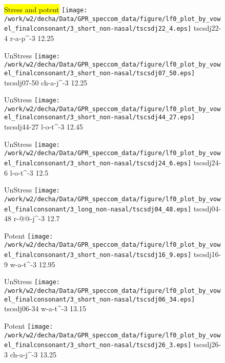 \documentclass{article}
\begin{document}
\begin{figure}[t]
\begin{minipage}[b]{.24\textwidth}
\colorbox{yellow}{Stress and potent}
\centering
\texttt{[image: /work/w2/decha/Data/GPR\_speccom\_data/figure/lf0\_plot\_by\_vowel\_finalconsonant/3\_short\_non-nasal/tscsdj22\_4.eps]}
tscsdj22-4 r-a-p\textasciicircum-3 12.25
\end{minipage}
\begin{minipage}[b]{.24\textwidth}
UnStress
\centering
\texttt{[image: /work/w2/decha/Data/GPR\_speccom\_data/figure/lf0\_plot\_by\_vowel\_finalconsonant/3\_short\_non-nasal/tscsdj07\_50.eps]}
tscsdj07-50 ch-a-j\textasciicircum-3 12.25
\end{minipage}
\begin{minipage}[b]{.24\textwidth}
UnStress
\centering
\texttt{[image: /work/w2/decha/Data/GPR\_speccom\_data/figure/lf0\_plot\_by\_vowel\_finalconsonant/3\_short\_non-nasal/tscsdj44\_27.eps]}
tscsdj44-27 l-o-t\textasciicircum-3 12.45
\end{minipage}
\begin{minipage}[b]{.24\textwidth}
UnStress
\centering
\texttt{[image: /work/w2/decha/Data/GPR\_speccom\_data/figure/lf0\_plot\_by\_vowel\_finalconsonant/3\_short\_non-nasal/tscsdj24\_6.eps]}
tscsdj24-6 l-o-t\textasciicircum-3 12.5
\end{minipage}
\end{figure}
\clearpage
\begin{figure}[t]
\begin{minipage}[b]{.24\textwidth}
UnStress
\centering
\texttt{[image: /work/w2/decha/Data/GPR\_speccom\_data/figure/lf0\_plot\_by\_vowel\_finalconsonant/3\_long\_non-nasal/tscsdj04\_48.eps]}
tscsdj04-48 r-@@-j\textasciicircum-3 12.7
\end{minipage}
\begin{minipage}[b]{.24\textwidth}
\colorbox{Apricot}{Potent}
\centering
\texttt{[image: /work/w2/decha/Data/GPR\_speccom\_data/figure/lf0\_plot\_by\_vowel\_finalconsonant/3\_short\_non-nasal/tscsdj16\_9.eps]}
tscsdj16-9 w-a-t\textasciicircum-3 12.95
\end{minipage}
\begin{minipage}[b]{.24\textwidth}
UnStress
\centering
\texttt{[image: /work/w2/decha/Data/GPR\_speccom\_data/figure/lf0\_plot\_by\_vowel\_finalconsonant/3\_short\_non-nasal/tscsdj06\_34.eps]}
tscsdj06-34 w-a-t\textasciicircum-3 13.15
\end{minipage}
\begin{minipage}[b]{.24\textwidth}
\colorbox{Apricot}{Potent}
\centering
\texttt{[image: /work/w2/decha/Data/GPR\_speccom\_data/figure/lf0\_plot\_by\_vowel\_finalconsonant/3\_short\_non-nasal/tscsdj26\_3.eps]}
tscsdj26-3 ch-a-j\textasciicircum-3 13.25
\end{minipage}
\end{figure}
\end{document}
